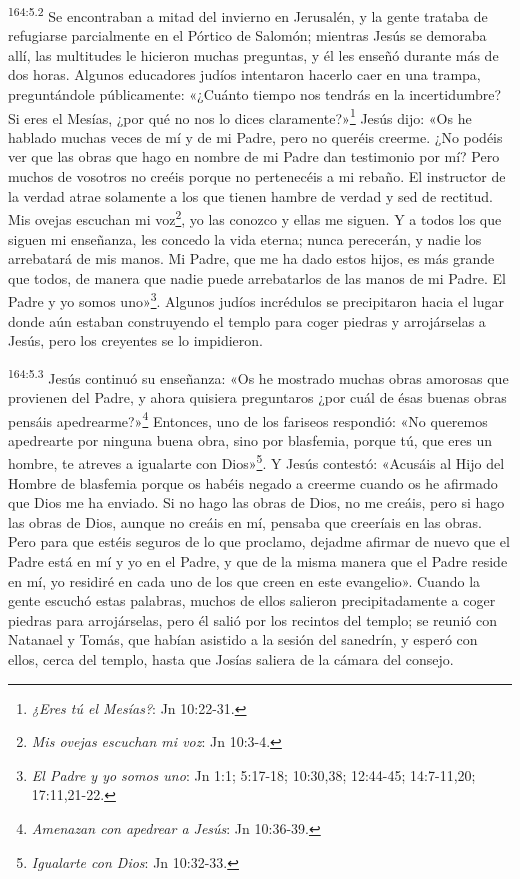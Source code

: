 \par 
\textsuperscript{164:5.2} Se encontraban a mitad del invierno en Jerusalén, y la gente trataba de refugiarse parcialmente en el Pórtico de Salomón; mientras Jesús se demoraba allí, las multitudes le hicieron muchas preguntas, y él les enseñó durante más de dos horas. Algunos educadores judíos intentaron hacerlo caer en una trampa, preguntándole públicamente: «¿Cuánto tiempo nos tendrás en la incertidumbre? Si eres el Mesías, ¿por qué no nos lo dices claramente?»\footnote{\textit{¿Eres tú el Mesías?}: Jn 10:22-31.} Jesús dijo: «Os he hablado muchas veces de mí y de mi Padre, pero no queréis creerme. ¿No podéis ver que las obras que hago en nombre de mi Padre dan testimonio por mí? Pero muchos de vosotros no creéis porque no pertenecéis a mi rebaño. El instructor de la verdad atrae solamente a los que tienen hambre de verdad y sed de rectitud. Mis ovejas escuchan mi voz\footnote{\textit{Mis ovejas escuchan mi voz}: Jn 10:3-4.}, yo las conozco y ellas me siguen. Y a todos los que siguen mi enseñanza, les concedo la vida eterna; nunca perecerán, y nadie los arrebatará de mis manos. Mi Padre, que me ha dado estos hijos, es más grande que todos, de manera que nadie puede arrebatarlos de las manos de mi Padre. El Padre y yo somos uno»\footnote{\textit{El Padre y yo somos uno}: Jn 1:1; 5:17-18; 10:30,38; 12:44-45; 14:7-11,20; 17:11,21-22.}. Algunos judíos incrédulos se precipitaron hacia el lugar donde aún estaban construyendo el templo para coger piedras y arrojárselas a Jesús, pero los creyentes se lo impidieron.

\par 
\textsuperscript{164:5.3} Jesús continuó su enseñanza: «Os he mostrado muchas obras amorosas que provienen del Padre, y ahora quisiera preguntaros ¿por cuál de ésas buenas obras pensáis apedrearme?»\footnote{\textit{Amenazan con apedrear a Jesús}: Jn 10:36-39.} Entonces, uno de los fariseos respondió: «No queremos apedrearte por ninguna buena obra, sino por blasfemia, porque tú, que eres un hombre, te atreves a igualarte con Dios»\footnote{\textit{Igualarte con Dios}: Jn 10:32-33.}. Y Jesús contestó: «Acusáis al Hijo del Hombre de blasfemia porque os habéis negado a creerme cuando os he afirmado que Dios me ha enviado. Si no hago las obras de Dios, no me creáis, pero si hago las obras de Dios, aunque no creáis en mí, pensaba que creeríais en las obras. Pero para que estéis seguros de lo que proclamo, dejadme afirmar de nuevo que el Padre está en mí y yo en el Padre, y que de la misma manera que el Padre reside en mí, yo residiré en cada uno de los que creen en este evangelio». Cuando la gente escuchó estas palabras, muchos de ellos salieron precipitadamente a coger piedras para arrojárselas, pero él salió por los recintos del templo; se reunió con Natanael y Tomás, que habían asistido a la sesión del sanedrín, y esperó con ellos, cerca del templo, hasta que Josías saliera de la cámara del consejo.

